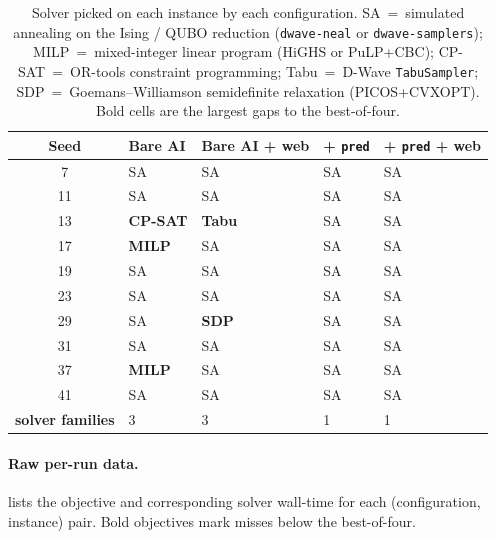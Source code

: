 \documentclass{article}
\begin{document}
\begin{table}[h]
\caption{Solver picked on each instance by each configuration.
SA~=~simulated annealing on the Ising / QUBO reduction (\texttt{dwave-neal} or \texttt{dwave-samplers}); MILP~=~mixed-integer linear program (HiGHS or PuLP+CBC); CP-SAT~=~OR-tools constraint programming; Tabu~=~D-Wave \texttt{TabuSampler}; SDP~=~Goemans--Williamson semidefinite relaxation (PICOS+CVXOPT).
Bold cells are the largest gaps to the best-of-four.}
\label{tab:end-user-solver-table}
\centering
\small
\begin{tabular}{@{}c@{\hspace{2pt}}llll@{}}
\toprule
Seed & Bare AI         & Bare AI + web   & + \texttt{pred}   & + \texttt{pred} + web \\
\midrule
 7 & SA                & SA                & SA & SA \\
11 & SA                & SA                & SA & SA \\
13 & \textbf{CP-SAT}   & \textbf{Tabu}     & SA & SA \\
17 & \textbf{MILP}     & SA                & SA & SA \\
19 & SA                & SA                & SA & SA \\
23 & SA                & SA                & SA & SA \\
29 & SA                & \textbf{SDP}      & SA & SA \\
31 & SA                & SA                & SA & SA \\
37 & \textbf{MILP}     & SA                & SA & SA \\
41 & SA                & SA                & SA & SA \\
\midrule
\textbf{solver families} & 3 & 3 & 1 & 1 \\
\bottomrule
\end{tabular}
\end{table}

\paragraph{Raw per-run data.}
 lists the objective and corresponding solver wall-time for each (configuration, instance) pair. Bold objectives mark misses below the best-of-four.
\end{document}
